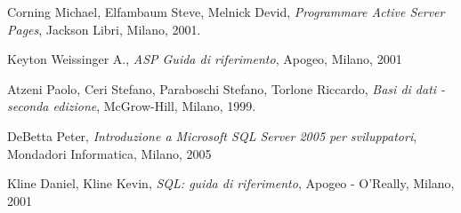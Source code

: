 \clearpage
\begin{thebibliography}{9}
		Corning Michael, Elfambaum Steve, Melnick Devid,
		\emph{Programmare Active Server Pages}, Jackson Libri, Milano, 2001.

		Keyton Weissinger A.,
		\emph{ASP Guida di riferimento}, Apogeo, Milano, 2001

		Atzeni Paolo, Ceri Stefano, Paraboschi Stefano, Torlone Riccardo,
		\emph{Basi di dati - seconda edizione}, McGrow-Hill, Milano, 1999.
	
		DeBetta Peter,
		\emph{Introduzione a Microsoft SQL Server 2005 per sviluppatori},
		Mondadori Informatica, Milano, 2005
	
		Kline Daniel, Kline Kevin,
		\emph{SQL: guida di riferimento}, Apogeo - O'Really, Milano, 2001
\end{thebibliography}
